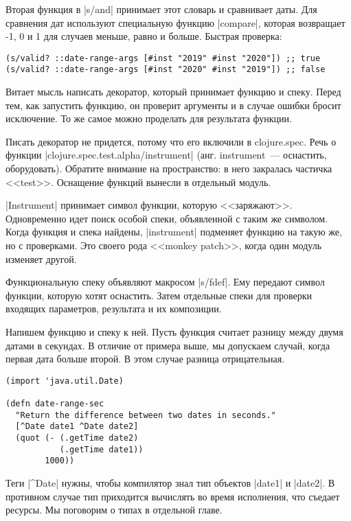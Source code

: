 Вторая функция в \spverb|s/and| принимает этот словарь и сравнивает даты. Для
сравнения дат используют специальную функцию \spverb|compare|, которая возвращает
-1, 0 и 1 для случаев меньше, равно и больше. Быстрая проверка:

\begin{verbatim}
(s/valid? ::date-range-args [#inst "2019" #inst "2020"]) ;; true
(s/valid? ::date-range-args [#inst "2020" #inst "2019"]) ;; false
\end{verbatim}

Витает мысль написать декоратор, который принимает функцию и спеку. Перед тем,
как запустить функцию, он проверит аргументы и в случае ошибки бросит
исключение. То же самое можно проделать для результата функции.

Писать декоратор не придется, потому что его включили в clojure.spec. Речь о
функции \spverb|clojure.spec.test.alpha/instrument| (анг. instrument~---
оснастить, оборудовать). Обратите внимание на пространство: в него закралась
частичка <<test>>. Оснащение функций вынесли в отдельный модуль.

\spverb|Instrument| принимает символ функции, которую <<заряжают>>. Одновременно
идет поиск особой спеки, объявленной с таким же символом. Когда функция и спека
найдены, \spverb|instrument| подменяет функцию на такую же, но с проверками. Это своего
рода <<monkey patch>>, когда один модуль изменяет другой.

Функциональную спеку объявляют макросом \spverb|s/fdef|. Ему передают символ
функции, которую хотят оснастить. Затем отдельные спеки для проверки входящих
параметров, результата и их композиции.

Напишем функцию и спеку к ней. Пусть функция считает разницу между двумя датами
в секундах. В отличие от примера выше, мы допускаем случай, когда первая дата
больше второй. В этом случае разница отрицательная.

\begin{verbatim}
(import 'java.util.Date)

(defn date-range-sec
  "Return the difference between two dates in seconds."
  [^Date date1 ^Date date2]
  (quot (- (.getTime date2)
           (.getTime date1))
        1000))
\end{verbatim}

Теги \spverb|^Date| нужны, чтобы компилятор знал тип объектов \spverb|date1| и
\spverb|date2|. В противном случае тип приходится вычислять во время исполнения,
что съедает ресурсы. Мы поговорим о типах в отдельной главе.

